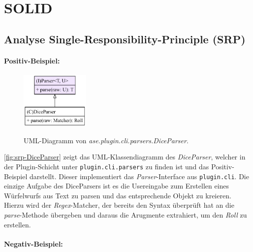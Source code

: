 \chapter{SOLID}

\section{Analyse Single-Responsibility-Principle (SRP)}

\subsubsection{Positiv-Beispiel:}

\begin{figure}
	\centering
	\vspace{-30pt} %
	\includegraphics[width=0.30\textwidth]{Bilder/DiceParser_structure.pdf}
	\vspace{-10pt}
	\caption[UML-Diagramm von ase.plugin.cli.parsers.DiceParser.]{\unskip}
	UML-Diagramm von \textit{ase.plugin.cli.parsers.DiceParser}.
	\label{fig:srp-DiceParser}
\end{figure}

\autoref{fig:srp-DiceParser} zeigt das UML-Klassendiagramm des \textit{DiceParser}, welcher in der Plugin-Schicht
unter \texttt{plugin.cli.parsers} zu finden ist und das Positiv-Beispiel darstellt. 
Dieser implementiert das \textit{Parser}-Interface aus 
\texttt{plugin.cli}. Die einzige Aufgabe des DiceParsers ist es die Usereingabe zum Erstellen eines Würfelwurfs
aus Text zu parsen und das entsprechende Objekt zu kreieren. Hierzu wird der \textit{Regex}-Matcher, der 
bereits den Syntax überprüft hat an die \textit{parse}-Methode übergeben und daraus die Arugmente extrahiert, 
um den \textit{Roll} zu erstellen.

\subsubsection{Negativ-Beispiel:}

